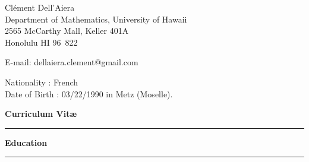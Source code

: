 \documentclass[a4paper,11pt]{article}
\newcommand{\titre}[1]{%
	\begin{center}
	\bigskip
	\rule{\textwidth}{1pt}
	\par\vspace{0.1cm}
        \textbf{\large #1}
	\par\rule{\textwidth}{1pt}
	\end{center}
	\bigskip
	}
\begin{document}
\begin{flushleft}
Clément Dell'Aiera \\
Department of Mathematics, University of Hawaii\\
2565 McCarthy Mall, Keller 401A \\
Honolulu HI 96\ 822 \\

\medskip

E-mail: dellaiera.clement@gmail.com


\end{flushleft}
\begin{flushleft}
Nationality : French \\
Date of Birth : 03/22/1990 in Metz (Moselle).
\end{flushleft}

\vspace{1.5cm}
\begin{center}
\par\huge{\textbf{Curriculum Vit\ae} }
\end{center}

\titre{Education}
\end{document}
